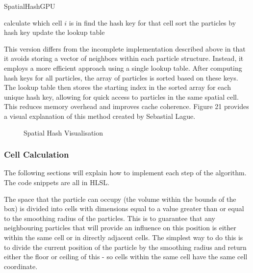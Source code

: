 \documentclass[12pt]{article}
\newcommand{\wideimage}[2][]{%
  \makebox[\textwidth][c]{\texttt{[image: \#2]}}%
}
\begin{document}
    \begin{algorithm}
        \caption{SpatialHashGPU}
        \begin{algorithmic}[1]
                \State calculate which cell $i$ is in
                \State find the hash key for that cell
            \EndFor
                \State sort the particles by hash key
            \EndFor
                \State update the lookup table
            \EndFor
        \end{algorithmic}
    \end{algorithm}

    This version differs from the incomplete implementation described above in that it avoids storing a vector of neighbors within each particle structure. Instead, it employs a more efficient approach using a single lookup table. After computing hash keys for all particles, the array of particles is sorted based on these keys. The lookup table then stores the starting index in the sorted array for each unique hash key, allowing for quick access to particles in the same spatial cell. This reduces memory overhead and improves cache coherence. Figure 21 provides a visual explanation of this method created by Sebastial Lague\cite{lague}.
    
    \begin{figure}[H]
        \wideimage[]{spatialHashVisualisation.png}
        \caption{Spatial Hash Visualisation \cite{lague}}
    \end{figure}

    \subsubsection{Cell Calculation}

    The following sections will explain how to implement each step of the algorithm. The code snippets are all in HLSL.

    The space that the particle can occupy (the volume within the bounds of the box) is divided into cells with dimensions equal to a value greater than or equal to the smoothing radius of the particles. This is to guarantee that any neighbouring particles that will provide an influence on this position is either within the same cell or in directly adjacent cells. The simplest way to do this is to divide the current position of the particle by the smoothing radius and return either the floor or ceiling of this - so cells within the same cell have the same cell coordinate.
\end{document}
